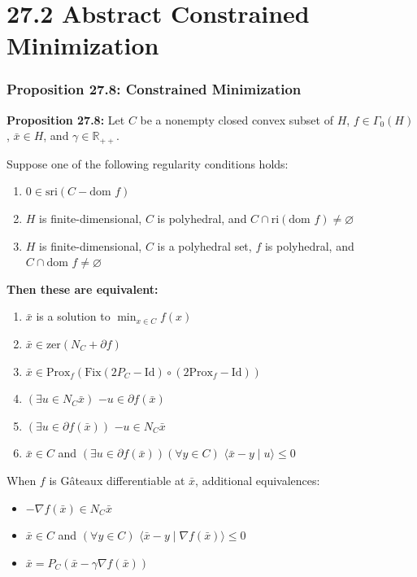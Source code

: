 \documentclass[aspectratio=169,10pt]{beamer}
\begin{document}
\section{27.2 Abstract Constrained Minimization}

\begin{frame}[allowframebreaks]
\frametitle{Proposition 27.8: Constrained Minimization}

\textbf{Proposition 27.8:} Let $C$ be a nonempty closed convex subset of $H$, $f \in \Gamma_0(H)$, $\bar{x} \in H$, and $\gamma \in \mathbb{R}_{++}$.

Suppose one of the following regularity conditions holds:
\begin{enumerate}
    \item[(a)] $0 \in \text{sri}(C - \text{dom } f)$
    \item[(b)] $H$ is finite-dimensional, $C$ is polyhedral, and $C \cap \text{ri}(\text{dom } f) \neq \varnothing$
    \item[(c)] $H$ is finite-dimensional, $C$ is a polyhedral set, $f$ is polyhedral, and $C \cap \text{dom } f \neq \varnothing$
\end{enumerate}

\textbf{Then these are equivalent:}
\begin{enumerate}
    \item[(i)] $\bar{x}$ is a solution to $\min_{x \in C} f(x)$
    \item[(ii)] $\bar{x} \in \text{zer}(N_C + \partial f)$
    \item[(iii)] $\bar{x} \in \text{Prox}_f(\text{Fix}(2P_C - \text{Id}) \circ (2\text{Prox}_f - \text{Id}))$
    \item[(iv)] $(\exists u \in N_C \bar{x})$ $-u \in \partial f(\bar{x})$
    \item[(v)] $(\exists u \in \partial f(\bar{x}))$ $-u \in N_C \bar{x}$
    \item[(vi)] $\bar{x} \in C$ and $(\exists u \in \partial f(\bar{x}))(\forall y \in C)$ $\langle \bar{x} - y \mid u \rangle \leq 0$
\end{enumerate}

When $f$ is Gâteaux differentiable at $\bar{x}$, additional equivalences:
\begin{itemize}
    \item $-\nabla f(\bar{x}) \in N_C \bar{x}$
    \item $\bar{x} \in C$ and $(\forall y \in C)$ $\langle \bar{x} - y \mid \nabla f(\bar{x}) \rangle \leq 0$
    \item $\bar{x} = P_C(\bar{x} - \gamma \nabla f(\bar{x}))$
\end{itemize}

\end{frame}
\end{document}
